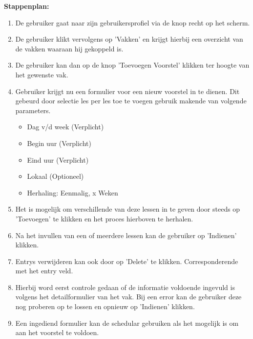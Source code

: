 \textbf{Stappenplan:}
	\begin{enumerate}
	\item De gebruiker gaat naar zijn gebruikersprofiel via de knop recht op het scherm.
	\item De gebruiker klikt vervolgens op 'Vakken' en krijgt hierbij een overzicht van de vakken waaraan hij gekoppeld is.
	\item De gebruiker kan dan op de knop 'Toevoegen Voorstel' klikken ter hoogte van het gewenste vak.
	\item Gebruiker krijgt nu een formulier voor een nieuw voorstel in te dienen. Dit gebeurd door selectie les per les toe te voegen gebruik makende van volgende parameters.
		\begin{itemize}
		\item Dag v/d week (Verplicht)
		\item Begin uur (Verplicht)
		\item Eind uur (Verplicht)
		\item Lokaal (Optioneel)
		\item Herhaling: Eenmalig, x Weken
		\end{itemize}
	\item Het is mogelijk om verschillende van deze lessen in te geven door steeds op 'Toevoegen' te klikken en het proces hierboven te herhalen.
	\item Na het invullen van een of meerdere lessen kan de gebruiker op 'Indienen' klikken.
	\item Entrys verwijderen kan ook door op 'Delete' te klikken. Corresponderende met het entry veld.
	\item Hierbij word eerst controle gedaan of de informatie voldoende ingevuld is volgens het detailformulier van het vak. Bij een error kan de gebruiker deze nog proberen op te lossen en opnieuw op 'Indienen' klikken.
	\item Een ingediend formulier kan de schedular gebruiken als het mogelijk is om aan het voorstel te voldoen.
	\end{enumerate}	        

